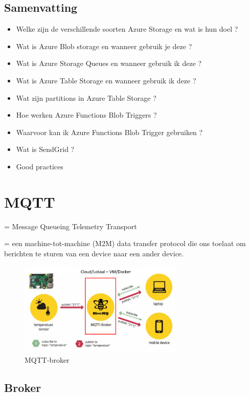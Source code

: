 \documentclass{article}
\begin{document}
\subsection{Samenvatting}

\begin{itemize}
    \item Welke zijn de verschillende soorten Azure Storage en wat is hun doel ?
    \item Wat is Azure Blob storage en wanneer gebruik je deze ?
    \item Wat is Azure Storage Queues en wanneer gebruik ik deze ?
    \item Wat is Azure Table Storage en wanneer gebruik ik deze ?
    \item Wat zijn partitions in Azure Table Storage ?
    \item Hoe werken Azure Functions Blob Triggers ?
    \item Waarvoor kan ik Azure Functions Blob Trigger gebruiken ?
    \item Wat is SendGrid ?
    \item Good practices
\end{itemize}

\section{MQTT}

= Message Queueing Telemetry Transport

= een machine-tot-machine (M2M) data transfer protocol die ons toelaat om berichten te sturen van een device naar een ander device.

\begin{figure}[H]
    \centering
    \includegraphics[width=0.7\textwidth]{mqtt.png}
    \caption{MQTT-broker}
\end{figure}

\subsection{Broker}
\end{document}
